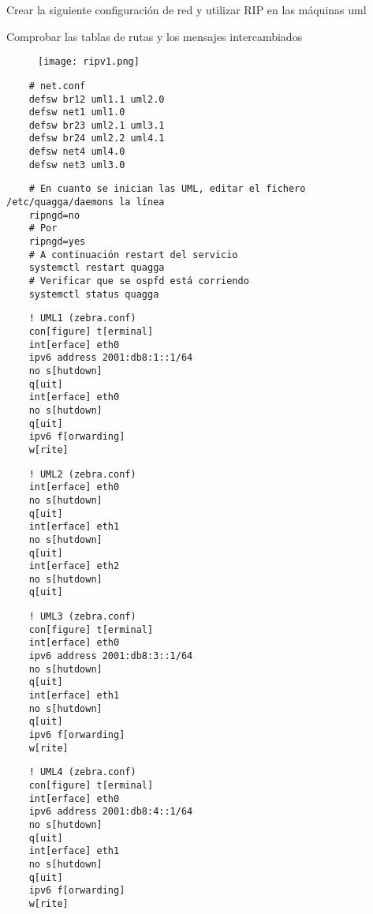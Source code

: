 Crear la siguiente configuración de red y utilizar RIP en las
máquinas uml

Comprobar las tablas de rutas y los mensajes intercambiados

  \begin{figure}[h]
    \texttt{[image: ripv1.png]}
    \centering
  \end{figure}

  \begin{verbatim}
    # net.conf
    defsw br12 uml1.1 uml2.0
    defsw net1 uml1.0
    defsw br23 uml2.1 uml3.1
    defsw br24 uml2.2 uml4.1
    defsw net4 uml4.0
    defsw net3 uml3.0
  \end{verbatim}

  \begin{verbatim}
    # En cuanto se inician las UML, editar el fichero /etc/quagga/daemons la línea
    ripngd=no
    # Por
    ripngd=yes
    # A continuación restart del servicio
    systemctl restart quagga
    # Verificar que se ospfd está corriendo
    systemctl status quagga
\end{verbatim}

  \begin{verbatim}
    ! UML1 (zebra.conf)
    con[figure] t[erminal]
    int[erface] eth0
    ipv6 address 2001:db8:1::1/64
    no s[hutdown]
    q[uit]
    int[erface] eth0
    no s[hutdown]
    q[uit]
    ipv6 f[orwarding]
    w[rite]
  \end{verbatim}

  \begin{verbatim}
    ! UML2 (zebra.conf)
    int[erface] eth0
    no s[hutdown]
    q[uit]
    int[erface] eth1
    no s[hutdown]
    q[uit]
    int[erface] eth2
    no s[hutdown]
    q[uit]
  \end{verbatim}

  \begin{verbatim}
    ! UML3 (zebra.conf)
    con[figure] t[erminal]
    int[erface] eth0
    ipv6 address 2001:db8:3::1/64
    no s[hutdown]
    q[uit]
    int[erface] eth1
    no s[hutdown]
    q[uit]
    ipv6 f[orwarding]
    w[rite]
  \end{verbatim}

  \begin{verbatim}
    ! UML4 (zebra.conf)
    con[figure] t[erminal]
    int[erface] eth0
    ipv6 address 2001:db8:4::1/64
    no s[hutdown]
    q[uit]
    int[erface] eth1
    no s[hutdown]
    q[uit]
    ipv6 f[orwarding]
    w[rite]
  \end{verbatim}

